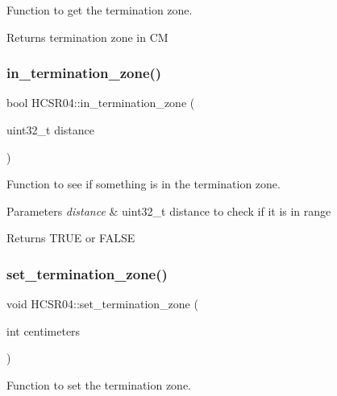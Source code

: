 Function to get the termination zone. 

\begin{DoxyReturn}{Returns}
termination zone in CM 
\end{DoxyReturn}
\mbox{\label{class_h_c_s_r04_a927ed3c322a83c02e4739ee2cc4b45a2}} 
\subsubsection{\texorpdfstring{in\+\_\+termination\+\_\+zone()}{in\_termination\_zone()}}
{\footnotesize\ttfamily bool H\+C\+S\+R04\+::in\+\_\+termination\+\_\+zone (\begin{DoxyParamCaption}\item[{uint32\+\_\+t}]{distance }\end{DoxyParamCaption})}



Function to see if something is in the termination zone. 


\begin{DoxyParams}{Parameters}
{\em distance} & uint32\+\_\+t distance to check if it is in range \\
\hline
\end{DoxyParams}
\begin{DoxyReturn}{Returns}
T\+R\+UE or F\+A\+L\+SE 
\end{DoxyReturn}
\mbox{\label{class_h_c_s_r04_aebbf05553e7818475e4846422088806e}} 
\subsubsection{\texorpdfstring{set\+\_\+termination\+\_\+zone()}{set\_termination\_zone()}}
{\footnotesize\ttfamily void H\+C\+S\+R04\+::set\+\_\+termination\+\_\+zone (\begin{DoxyParamCaption}\item[{int}]{centimeters }\end{DoxyParamCaption})}



Function to set the termination zone. 


